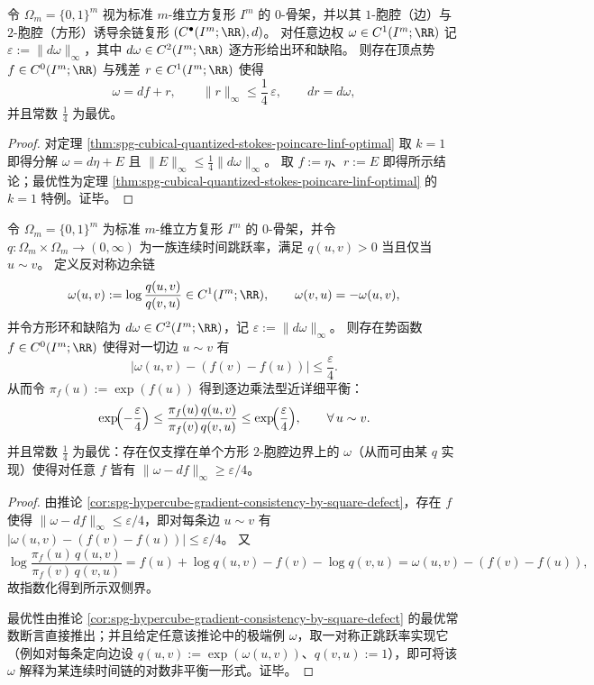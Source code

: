 \begin{corollary}[超立方体图上的势一致化与方形缺陷的最优线性控制]\label{cor:spg-hypercube-gradient-consistency-by-square-defect}
令 \(\Omega_m=\{0,1\}^m\) 视为标准 \(m\)-维立方复形 \(I^m\) 的 \(0\)-骨架，并以其 \(1\)-胞腔（边）与 \(2\)-胞腔（方形）诱导余链复形 \((C^\bullet(I^m;\RR),d)\)。
对任意边权 \(\omega\in C^1(I^m;\RR)\) 记
\(
\varepsilon:=\|d\omega\|_\infty
\)，其中 \(d\omega\in C^2(I^m;\RR)\) 逐方形给出环和缺陷。
则存在顶点势 \(f\in C^0(I^m;\RR)\) 与残差 \(r\in C^1(I^m;\RR)\) 使得
\[
\omega=df+r,\qquad \|r\|_\infty\le \frac14\,\varepsilon,
\qquad dr=d\omega,
\]
并且常数 \(\frac14\) 为最优。
\end{corollary}
\begin{proof}
对定理 \ref{thm:spg-cubical-quantized-stokes-poincare-linf-optimal} 取 \(k=1\) 即得分解 \(\omega=d\eta+E\) 且 \(\|E\|_\infty\le \frac14\|d\omega\|_\infty\)。
取 \(f:=\eta\)、\(r:=E\) 即得所示结论；最优性为定理 \ref{thm:spg-cubical-quantized-stokes-poincare-linf-optimal} 的 \(k=1\) 特例。证毕。
\end{proof}

\begin{theorem}\label{thm:spg-hypercube-near-detailed-balance-optimal}
令 \(\Omega_m=\{0,1\}^m\) 为标准 \(m\)-维立方复形 \(I^m\) 的 \(0\)-骨架，并令 \(q:\Omega_m\times\Omega_m\to(0,\infty)\) 为一族连续时间跳跃率，满足 \(q(u,v)>0\) 当且仅当 \(u\sim v\)。
定义反对称边余链
\[
\omega(u,v):=\log\frac{q(u,v)}{q(v,u)}\in C^1(I^m;\RR),
\qquad \omega(v,u)=-\omega(u,v),
\]
并令方形环和缺陷为 \(d\omega\in C^2(I^m;\RR)\)，记
\(
\varepsilon:=\|d\omega\|_\infty
\)。
则存在势函数 \(f\in C^0(I^m;\RR)\) 使得对一切边 \(u\sim v\) 有
\[
\bigl|\omega(u,v)-(f(v)-f(u))\bigr|\le \frac{\varepsilon}{4}.
\]
从而令 \(\pi_f(u):=\exp(f(u))\) 得到逐边乘法型近详细平衡：
\[
\exp\!\Bigl(-\frac{\varepsilon}{4}\Bigr)
\le
\frac{\pi_f(u)\,q(u,v)}{\pi_f(v)\,q(v,u)}
\le
\exp\!\Bigl(\frac{\varepsilon}{4}\Bigr),
\qquad \forall\,u\sim v.
\]
并且常数 \(\frac14\) 为最优：存在仅支撑在单个方形 \(2\)-胞腔边界上的 \(\omega\)（从而可由某 \(q\) 实现）使得对任意 \(f\) 皆有
\(
\|\omega-df\|_\infty\ge \varepsilon/4
\)。
\end{theorem}
\begin{proof}
由推论 \ref{cor:spg-hypercube-gradient-consistency-by-square-defect}，存在 \(f\) 使得 \(\|\omega-df\|_\infty\le \varepsilon/4\)，即对每条边 \(u\sim v\) 有
\(
|\omega(u,v)-(f(v)-f(u))|\le \varepsilon/4
\)。
又
\[
\log\frac{\pi_f(u)\,q(u,v)}{\pi_f(v)\,q(v,u)}
=
f(u)+\log q(u,v)-f(v)-\log q(v,u)
=
\omega(u,v)-(f(v)-f(u)),
\]
故指数化得到所示双侧界。
\par
最优性由推论 \ref{cor:spg-hypercube-gradient-consistency-by-square-defect} 的最优常数断言直接推出；并且给定任意该推论中的极端例 \(\omega\)，取一对称正跳跃率实现它（例如对每条定向边设 \(q(u,v):=\exp(\omega(u,v))\)、\(q(v,u):=1\)），即可将该 \(\omega\) 解释为某连续时间链的对数非平衡一形式。证毕。
\end{proof}

\endinput


